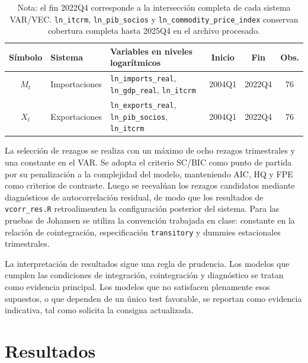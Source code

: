 \documentclass[11pt,a4paper]{article}
\begin{document}
	\begin{table}[H]
		\centering
		\caption{Sistemas iniciales para VAR/VEC.}
		\label{tab:sistemas-iniciales-var-vec}
		\small
		\begin{tabular}{clp{7.1cm}ccc}
			\toprule
			Símbolo & Sistema & Variables en niveles logarítmicos & Inicio & Fin & Obs. \\
			\midrule
			\(M_t\) & Importaciones &
			\texttt{ln\_imports\_real}, \texttt{ln\_gdp\_real}, \texttt{ln\_itcrm}
			& 2004Q1 & 2022Q4 & 76 \\
			\(X_t\) & Exportaciones &
			\texttt{ln\_exports\_real}, \texttt{ln\_pib\_socios}, \texttt{ln\_itcrm}
			& 2004Q1 & 2022Q4 & 76 \\
			\bottomrule
		\end{tabular}
		\caption*{\footnotesize Nota: el fin 2022Q4 corresponde a la intersección
			completa de cada sistema VAR/VEC. \texttt{ln\_itcrm},
			\texttt{ln\_pib\_socios} y \texttt{ln\_commodity\_price\_index} conservan
			cobertura completa hasta 2025Q4 en el archivo procesado.}
	\end{table}

	La selección de rezagos se realiza con un máximo de ocho rezagos trimestrales y
	una constante en el VAR. Se adopta el criterio SC/BIC como punto de partida por
	su penalización a la complejidad del modelo, manteniendo AIC, HQ y FPE como
	criterios de contraste. Luego se reevalúan los rezagos candidatos mediante
	diagnósticos de autocorrelación residual, de modo que los resultados de
	\texttt{vcorr\_res.R} retroalimenten la configuración posterior del sistema.
	Para las pruebas de Johansen se utiliza la convención trabajada en clase:
	constante en la relación de cointegración, especificación \texttt{transitory} y
	dummies estacionales trimestrales.

	La interpretación de resultados sigue una regla de prudencia. Los modelos que
	cumplen las condiciones de integración, cointegración y diagnóstico se tratan
	como evidencia principal. Los modelos que no satisfacen plenamente esos
	supuestos, o que dependen de un único test favorable, se reportan como evidencia
	indicativa, tal como solicita la consigna actualizada.

	\section{Resultados}
	\label{sec:resultados}
\end{document}
